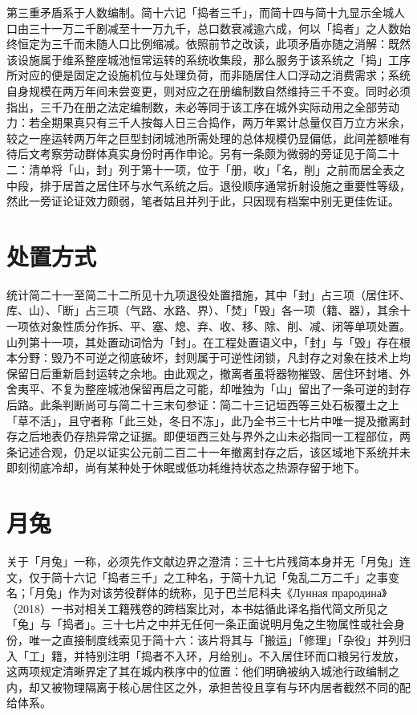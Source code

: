 第三重矛盾系于人数编制。简十六记「捣者三千」，而简十四与简十九显示全城人口由三十一万二千剧减至十一万九千，总口数衰减逾六成，何以「捣者」之人数始终恒定为三千而未随人口比例缩减。依照前节之改读，此项矛盾亦随之消解：既然该设施属于维系整座城池恒常运转的系统收集段，那么服务于该系统之「捣」工序所对应的便是固定之设施机位与处理负荷，而非随居住人口浮动之消费需求；系统自身规模在两万年间未尝变更，则对应之在册编制数自然维持三千不变。同时必须指出，三千乃在册之法定编制数，未必等同于该工序在城外实际动用之全部劳动力：若全期果真只有三千人按每人日三合捣作，两万年累计总量仅百万立方米余，较之一座运转两万年之巨型封闭城池所需处理的总体规模仍显偏低，此间差额唯有待后文考察劳动群体真实身份时再作申论。另有一条颇为微弱的旁证见于简二十二：清单将「山，封」列于第十一项，位于「册，收」「名，削」之前而居全表之中段，排于居首之居住环与水气系统之后。退役顺序通常折射设施之重要性等级，然此一旁证论证效力颇弱，笔者姑且并列于此，只因现有档案中别无更佳佐证。

\section{处置方式}

统计简二十一至简二十二所见十九项退役处置措施，其中「封」占三项（居住环、库、山）、「断」占三项（气路、水路、界）、「焚」「毁」各一项（籍、器），其余十一项依对象性质分作拆、平、塞、熄、弃、收、移、除、削、减、闭等单项处置。山列第十一项，其处置动词恰为「封」。在工程处置语义中，「封」与「毁」存在根本分野：毁乃不可逆之彻底破坏，封则属于可逆性闭锁，凡封存之对象在技术上均保留日后重新启封运转之余地。由此观之，撤离者虽将器物摧毁、居住环封堵、外舍夷平、不复为整座城池保留再启之可能，却唯独为「山」留出了一条可逆的封存后路。此条判断尚可与简二十三末句参证：简二十三记垣西等三处石板覆土之上「草不活」，且守者称「此三处，冬日不冻」，此乃全书三十七片中唯一提及撤离封存之后地表仍存热异常之证据。即便垣西三处与界外之山未必指同一工程部位，两条记述合观，仍足以证实公元前二百二十一年撤离封存之后，该区域地下系统并未即刻彻底冷却，尚有某种处于休眠或低功耗维持状态之热源存留于地下。

\section{月兔}

关于「月兔」一称，必须先作文献边界之澄清：三十七片残简本身并无「月兔」连文，仅于简十六记「捣者三千」之工种名，于简十九记「兔乱二万二千」之事变名；「月兔」作为对该劳役群体的统称，见于巴兰尼科夫《Лунная прародина》（2018）一书对相关工籍残卷的跨档案比对，本书姑循此译名指代简文所见之「兔」与「捣者」。三十七片之中并无任何一条正面说明月兔之生物属性或社会身份，唯一之直接制度线索见于简十六：该片将其与「搬运」「修理」「杂役」并列归入「工」籍，并特别注明「捣者不入环，月给别」。不入居住环而口粮另行发放，这两项规定清晰界定了其在城内秩序中的位置：他们明确被纳入城池行政编制之内，却又被物理隔离于核心居住区之外，承担苦役且享有与环内居者截然不同的配给体系。

